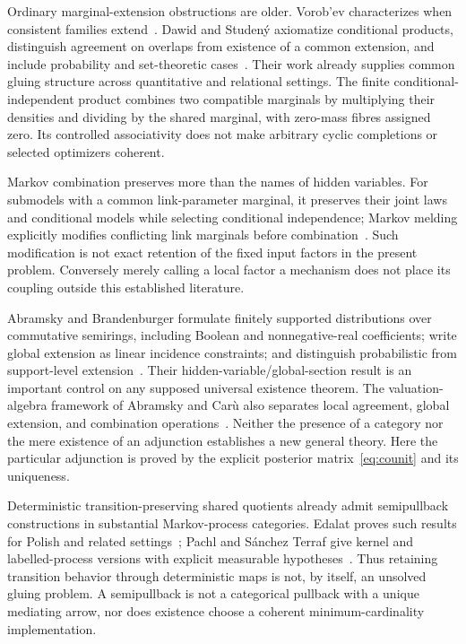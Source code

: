 \documentclass[11pt]{article}
\theoremstyle{remark}
\begin{document}
Ordinary marginal-extension obstructions are older. Vorob'ev characterizes when consistent families extend~\cite{Vorobev1962}. Dawid and Studen\'y axiomatize conditional products, distinguish agreement on overlaps from existence of a common extension, and include probability and set-theoretic cases~\cite{DawidStudeny1999}. Their work already supplies common gluing structure across quantitative and relational settings. The finite conditional-independent product combines two compatible marginals by multiplying their densities and dividing by the shared marginal, with zero-mass fibres assigned zero. Its controlled associativity does not make arbitrary cyclic completions or selected optimizers coherent.

Markov combination preserves more than the names of hidden variables. For submodels with a common link-parameter marginal, it preserves their joint laws and conditional models while selecting conditional independence; Markov melding explicitly modifies conflicting link marginals before combination~\cite{Goudie2019}. Such modification is not exact retention of the fixed input factors in the present problem. Conversely merely calling a local factor a mechanism does not place its coupling outside this established literature.

Abramsky and Brandenburger formulate finitely supported distributions over commutative semirings, including Boolean and nonnegative-real coefficients; write global extension as linear incidence constraints; and distinguish probabilistic from support-level extension~\cite{AbramskyBrandenburger2011}. Their hidden-variable/global-section result is an important control on any supposed universal existence theorem. The valuation-algebra framework of Abramsky and Car\`u also separates local agreement, global extension, and combination operations~\cite{AbramskyCaru2019}. Neither the presence of a category nor the mere existence of an adjunction establishes a new general theory. Here the particular adjunction is proved by the explicit posterior matrix~\eqref{eq:counit} and its uniqueness.

Deterministic transition-preserving shared quotients already admit semipullback constructions in substantial Markov-process categories. Edalat proves such results for Polish and related settings~\cite{Edalat1999}; Pachl and S\'anchez Terraf give kernel and labelled-process versions with explicit measurable hypotheses~\cite{Pachl2021}. Thus retaining transition behavior through deterministic maps is not, by itself, an unsolved gluing problem. A semipullback is not a categorical pullback with a unique mediating arrow, nor does existence choose a coherent minimum-cardinality implementation.
\end{document}
